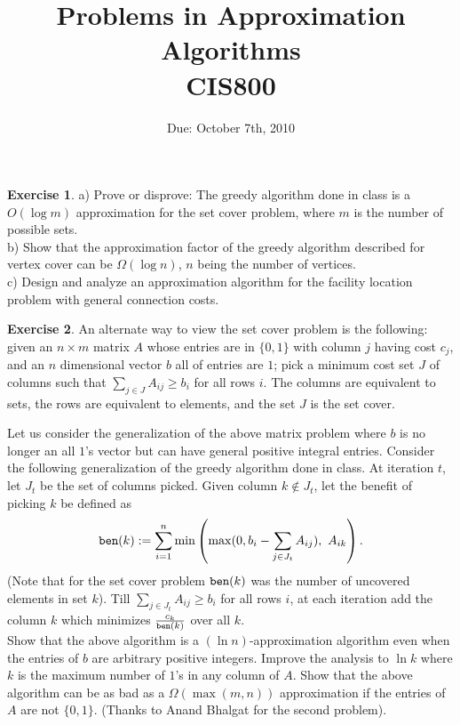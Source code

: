 \documentclass[11pt]{article}
\theoremstyle{definition}
\newtheorem{exercise}{Exercise}
\begin{document}
\title{{\bf Problems in Approximation Algorithms} \\ 
{\normalsize CIS800}}
\date{Due: October 7th, 2010}
\maketitle
\begin{exercise}
a) Prove or disprove: The greedy algorithm done in class is a $O(\log m)$ approximation for the set cover problem, where $m$ is the number of possible sets. \\

\noindent
b) Show that the approximation factor of the greedy algorithm described for vertex cover can be $\Omega(\log n)$, $n$ being the number of vertices. \\

\noindent
c) Design and analyze an approximation algorithm for the facility location problem with general connection costs.
\end{exercise}
\vspace{1ex}

\def\ben{{\tt ben}}

\begin{exercise}
An alternate way to view the set cover problem is the following: given an $n\times m$ matrix $A$ whose entries are in $\{0,1\}$ with column $j$ having cost $c_j$, and an $n$ dimensional vector $b$ all of entries are $1$; pick a minimum cost set $J$ of columns such that $\sum_{j\in J} A_{ij} \ge b_i$ for all rows $i$. The columns are equivalent to sets, the rows are equivalent to elements, and the set $J$ is the set cover. 

Let us consider the generalization of the above matrix problem where $b$ is no longer an all $1$'s vector
but can have general positive integral entries. Consider the following generalization of the greedy algorithm done in class. At iteration $t$, let $J_t$ be the set of columns picked. Given column $k \notin J_t$, let the 
benefit of picking $k$ be defined as 
$$\ben(k) := \sum_{i=1}^n \min\left(\max(0,b_i - \sum_{j\in J_t} A_{ij}), ~A_{ik}\right).$$
(Note that for the set cover problem $\ben(k)$ was the number of uncovered elements in set $k$).
Till $\sum_{j\in J_t}A_{ij} \ge b_i$ for all rows $i$, at each iteration add the column $k$ which minimizes $\frac{c_k}{\ben(k)}$ over all $k$.\\

\noindent
Show that the above algorithm is a $(\ln n)$-approximation algorithm even when the entries of $b$ are arbitrary positive integers. Improve the analysis to $\ln k$ where $k$ is the maximum number of $1$'s in any column of $A$. Show that the above algorithm can be as bad as a $\Omega(\max(m,n))$ approximation if the entries of $A$ are not $\{0,1\}$. (Thanks to Anand Bhalgat for the second problem).
\end{exercise}
\vspace{1ex}
\end{document}
